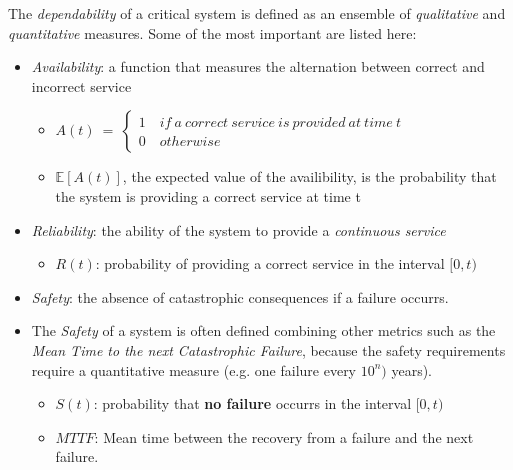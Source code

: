 The \textsl{dependability} of a critical system is defined as an ensemble of \textsl{qualitative} and \textsl{quantitative} measures.
Some of the most important are listed here:

\begin{itemize}
	\item \textsl{Availability}: a function that measures the alternation between correct and incorrect service
	\vspace{0.4cm}
	\begin{itemize}
		\item[]
	$
		A(t)\: =\: \begin{cases}
		1\quad if\: a\ correct\: service\: is\: provided\: at\: time\: t \\
		0\quad otherwise
		\end{cases}
	$
	\vspace{0.2cm}
		\item[] $\mathbb{E}[A(t)]$, the expected value of the availibility, is the probability that the system is providing a correct service at time t
	\end{itemize}
\end{itemize}

\begin{itemize}
	\item \textsl{Reliability}: the ability of the system to provide a \textsl{continuous service}
	\vspace{0.4cm}
	\begin{itemize}
		\item[] $R(t)$: probability of providing a correct service in the interval $[0, t)$
	\end{itemize}
\end{itemize}

\begin{itemize}
	\item \textsl{Safety}: the absence of catastrophic consequences if a failure occurrs.
	\item The \textsl{Safety} of a system is often defined combining other metrics such as the \textsl{Mean Time to the next Catastrophic Failure}, because the safety requirements require a quantitative measure (e.g. one failure every $10^{n})$ years).
	\vspace{0.4cm}
	\begin{itemize}
		\item[] $S(t)$: probability that \textbf{no failure} occurrs in the interval $[0,t)$
		\vspace{0.2cm}
		\item[] $MTTF$: Mean time between the recovery from a failure and the next failure.
	\end{itemize}
\end{itemize}

